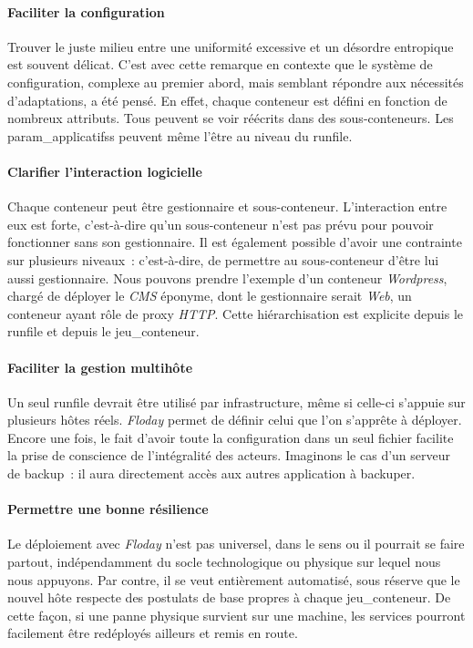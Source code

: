 \paragraph{Faciliter la configuration}
Trouver le juste milieu entre une uniformité excessive et un désordre entropique est souvent délicat.
C'est avec cette remarque en contexte que le système de configuration, complexe au premier abord, mais semblant répondre aux nécessités d'adaptations, a été pensé.
En effet, chaque \gls{conteneur} est défini en fonction de nombreux \glspl{attribut}.
Tous peuvent se voir réécrits dans des \glspl{sous-conteneur}.
Les \glspl{param_applicatifs} peuvent même l'être au niveau du \gls{runfile}.

\paragraph{Clarifier l'interaction logicielle}
Chaque \gls{conteneur} peut être \gls{gestionnaire} et \gls{sous-conteneur}.
L'interaction entre eux est forte, c'est-à-dire qu'un sous-conteneur n'est pas prévu pour pouvoir fonctionner sans son gestionnaire.
Il est également possible d'avoir une contrainte sur plusieurs niveaux~: c'est-à-dire, de permettre au sous-conteneur d'être lui aussi gestionnaire.
Nous pouvons prendre l'exemple d'un conteneur \emph{Wordpress}, chargé de déployer le \emph{CMS} éponyme, dont le gestionnaire serait \emph{Web}, un conteneur ayant rôle de proxy \emph{HTTP}.
Cette hiérarchisation est explicite depuis le \gls{runfile} et depuis le \gls{jeu_conteneur}.

\paragraph{Faciliter la gestion multihôte}
Un seul \gls{runfile} devrait être utilisé par infrastructure, même si celle-ci s'appuie sur plusieurs hôtes réels.
\emph{Floday} permet de définir celui que l'on s'apprête à déployer.
Encore une fois, le fait d'avoir toute la configuration dans un seul fichier facilite la prise de conscience de l'intégralité des acteurs.
Imaginons le cas d'un serveur de backup~: il aura directement accès aux autres \gls{application} à backuper.

\paragraph{Permettre une bonne résilience}
Le déploiement avec \emph{Floday} n'est pas universel, dans le sens ou il pourrait se faire partout, indépendamment du socle technologique ou physique sur lequel nous nous appuyons.
Par contre, il se veut entièrement automatisé, sous réserve que le nouvel hôte respecte des postulats de base propres à chaque \gls{jeu_conteneur}.
De cette façon, si une panne physique survient sur une machine, les services pourront facilement être redéployés ailleurs et remis en route.
